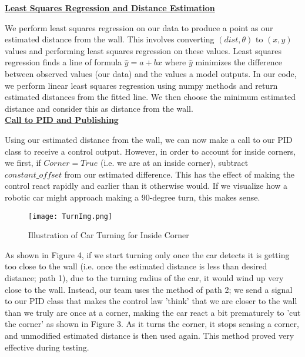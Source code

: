 \documentclass{article}
\begin{document}
\textbf{\underline{Least Squares Regression and Distance Estimation}}

We perform least squares regression on our data to produce a point as our estimated distance from the wall. This involves converting $(dist,\theta)$ to $(x,y)$ values and performing least squares regression on these values. Least squares regression finds a line of formula $\hat{y}=a+bx$ where $\hat{y}$ minimizes the difference between observed values (our data) and the values a model outputs. In our code, we perform linear least squares regression using numpy methods and return estimated distances from the fitted line. We then choose the minimum estimated distance and consider this as distance from the wall. \\

\textbf{\underline{Call to PID and Publishing}}

Using our estimated distance from the wall, we can now make a call to our PID class to receive a control output. However, in order to account for inside corners, we first, if $Corner=True$ (i.e. we are at an inside corner), subtract $constant\_offset$ from our estimated difference. This has the effect of making the control react rapidly and earlier than it otherwise would. If we visualize how a robotic car might approach making a 90-degree turn, this makes sense. \\

\begin{figure}[h]
\begin{center}
\texttt{[image: TurnImg.png]} %
\caption{Illustration of Car Turning for Inside Corner}
\end{center}
\label{turning}
\end{figure}

As shown in Figure 4, if we start turning only once the car detects it is getting too close to the wall (i.e. once the estimated distance is less than desired distance; path 1), due to the turning radius of the car, it would wind up very close to the wall. Instead, our team uses the method of path 2; we send a signal to our PID class that makes the control law 'think' that we are closer to the wall than we truly are once at a corner, making the car react a bit prematurely to 'cut the corner' as shown in Figure 3. As it turns the corner, it stops sensing a corner, and unmodified estimated distance is then used again. This method proved very effective during testing. \\
\end{document}
